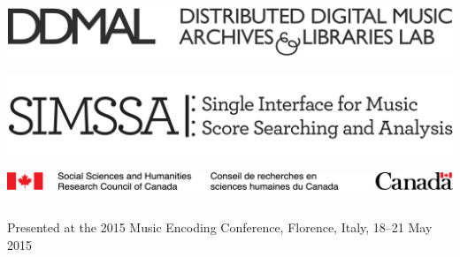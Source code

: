\documentclass[final]{beamer}
\newlength{\onecolwid}
\newcommand{\blockSpace}{\vskip 0.75ex}
\begin{document}
\begin{frame}[fragile,t]
\begin{columns}
\begin{column}{\onecolwid}
\begin{block}{}
\vspace{0.5cm}
\begin{flushleft}
\begin{minipage}{0.49\onecolwid}
\begin{flushleft}
\vspace{0.6615cm}
\includegraphics[scale=0.3591]{images/ddmal_logo_large_cropped}
\end{flushleft}
\end{minipage}
\begin{minipage}{0.49\onecolwid}
\begin{flushright}
\includegraphics[scale=0.945]{images/SIMSSA_logo}
\end{flushright}
\end{minipage}
\end{flushleft}

\vspace{1.5cm}

\includegraphics[width=\onecolwid]{images/SSHRC_logo}
\end{block}
\end{column}

\end{columns}

\vspace{1.5em}

\begin{center}
    \footnotesize
    Presented at the 2015 Music Encoding Conference, Florence, Italy, 18--21 May 2015
\end{center}
\end{frame}
\end{document}
